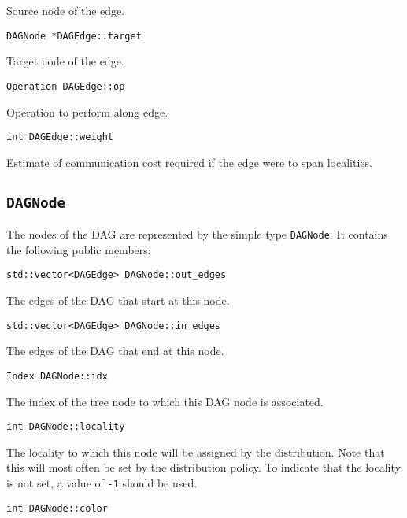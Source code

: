 Source node of the edge.

\begin{lstlisting}
DAGNode *DAGEdge::target
\end{lstlisting}


Target node of the edge.

\begin{lstlisting}
Operation DAGEdge::op
\end{lstlisting}


Operation to perform along edge.

\begin{lstlisting}
int DAGEdge::weight
\end{lstlisting}


Estimate of communication cost required if the edge were to span localities.


\subsection{\texttt{DAGNode}}

The nodes of the DAG are represented by the simple type \texttt{DAGNode}. It
contains the following public members:

\begin{lstlisting}
std::vector<DAGEdge> DAGNode::out_edges
\end{lstlisting}


The edges of the DAG that start at this node.

\begin{lstlisting}
std::vector<DAGEdge> DAGNode::in_edges
\end{lstlisting}


The edges of the DAG that end at this node.

\begin{lstlisting}
Index DAGNode::idx
\end{lstlisting}


The index of the tree node to which this DAG node is associated.

\begin{lstlisting}
int DAGNode::locality
\end{lstlisting}


The locality to which this node will be assigned by the distribution. Note
that this will most often be set by the distribution policy. To indicate that
the locality is not set, a value of \texttt{-1} should be used.

\begin{lstlisting}
int DAGNode::color
\end{lstlisting}


